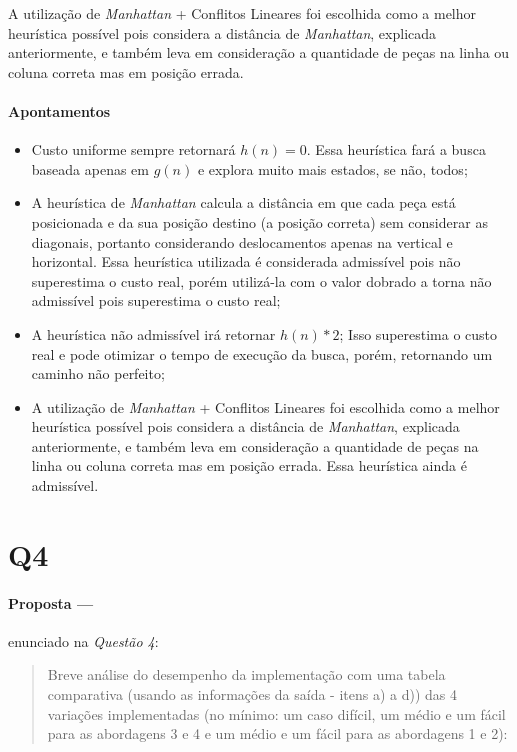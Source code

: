 \documentclass[12pt]{article}
\begin{document}
A utilização de \textit{Manhattan} + Conflitos Lineares foi escolhida como a melhor heurística possível pois considera a distância de \textit{Manhattan}, explicada anteriormente, e também leva em consideração a quantidade de peças na linha ou coluna correta mas em posição errada.

\paragraph{Apontamentos}
\begin{itemize}
  \item Custo uniforme sempre retornará $h(n) = 0$. Essa heurística fará a busca baseada apenas em $g(n)$ e explora
    muito mais estados, se não, todos;
  \item A heurística de \textit{Manhattan} calcula a distância em que cada peça está posicionada e da sua posição
    destino (a posição correta) sem considerar as diagonais, portanto considerando deslocamentos apenas na vertical e
    horizontal. Essa heurística utilizada é considerada admissível pois não superestima o custo real, porém utilizá-la
    com o valor dobrado a torna não admissível pois superestima o custo real\cite{sharma2016};
  \item A heurística não admissível irá retornar $h(n) * 2$; Isso superestima o custo real e pode otimizar o tempo de
    execução da busca, porém, retornando um caminho não perfeito;
  \item A utilização de \textit{Manhattan} + Conflitos Lineares foi escolhida como a melhor heurística possível pois considera a distância de \textit{Manhattan}, explicada anteriormente, e também leva em consideração a quantidade de peças na linha ou coluna correta mas em posição errada. Essa heurística ainda é admissível.
\end{itemize}

\newpage

\section{Q4}\label{sec:q4}

\paragraph{Proposta ---} enunciado na \textit{Questão 4}:

\begin{quote}
Breve análise do desempenho da implementação com uma tabela comparativa (usando as informações da saída - itens a) a d)) das 4 variações implementadas (no mínimo: um caso difícil, um médio e um fácil para as abordagens 3 e 4 e um médio e um fácil para as abordagens 1 e 2):
\end{quote}
\end{document}

